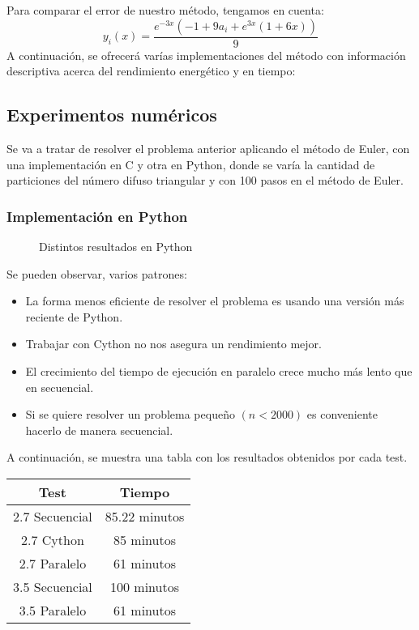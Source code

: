 Para comparar el error de nuestro método, tengamos en cuenta:
\[
	y_i(x) = \frac{e^{-3 x} (-1 + 9 a_i + e^{3 x}(1 + 6 x))}{9}
\]
A continuación, se ofrecerá varías implementaciones del método con información descriptiva acerca del rendimiento energético y en tiempo:

\subsection{Experimentos numéricos}
Se va a tratar de resolver el problema anterior aplicando el método de Euler, con una implementación en C y otra en Python, donde se varía la cantidad de particiones del número difuso triangular y con 100 pasos en el método de Euler.
\subsubsection{Implementación en Python}
\begin{figure}[H]
	\centering
	\caption{Distintos resultados en Python}
	\label{fig:eulerpython}
\end{figure}

Se pueden observar, varios patrones:

\begin{itemize}
	\item La forma menos eficiente de resolver el problema es usando una versión más reciente de Python.
	\item Trabajar con Cython no nos asegura un rendimiento mejor.
	\item El crecimiento del tiempo de ejecución en paralelo crece mucho más lento que en secuencial.
	\item Si se quiere resolver un problema pequeño $(n < 2000)$ es conveniente hacerlo de manera secuencial.
\end{itemize}

A continuación, se muestra una tabla con los resultados obtenidos por cada test.
\begin{table}[H]
	\centering
	\begin{tabular}{|c|c|}
		\hline
		\textbf{Test}  & \textbf{Tiempo}        \\ \hline
		2.7 Secuencial & 85.22 minutos \\ 
		2.7 Cython     & 85 minutos    \\
		2.7 Paralelo   & 61 minutos    \\
		3.5 Secuencial & 100 minutos   \\
		3.5 Paralelo   & 61 minutos   \\ \hline
	\end{tabular}%
\end{table}
